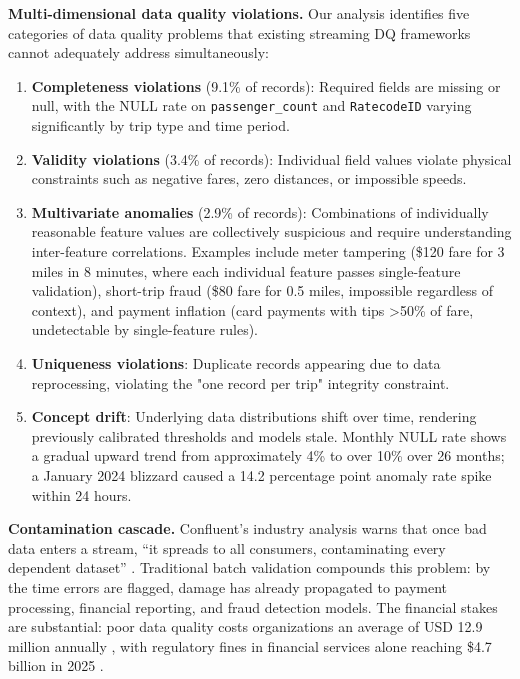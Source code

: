 \textbf{Multi-dimensional data quality violations.} Our analysis identifies five categories of data quality problems that existing streaming DQ frameworks cannot adequately address simultaneously:

\begin{enumerate}
    \item \textbf{Completeness violations} (9.1\% of records): Required fields are missing or null, with the NULL rate on \texttt{passenger\_count} and \texttt{RatecodeID} varying significantly by trip type and time period.
    \item \textbf{Validity violations} (3.4\% of records): Individual field values violate physical constraints such as negative fares, zero distances, or impossible speeds.
    \item \textbf{Multivariate anomalies} (2.9\% of records): Combinations of individually reasonable feature values are collectively suspicious and require understanding inter-feature correlations. Examples include meter tampering (\$120 fare for 3 miles in 8 minutes, where each individual feature passes single-feature validation), short-trip fraud (\$80 fare for 0.5 miles, impossible regardless of context), and payment inflation (card payments with tips >50\% of fare, undetectable by single-feature rules).
    \item \textbf{Uniqueness violations}: Duplicate records appearing due to data reprocessing, violating the "one record per trip" integrity constraint.
    \item \textbf{Concept drift}: Underlying data distributions shift over time, rendering previously calibrated thresholds and models stale. Monthly NULL rate shows a gradual upward trend from approximately 4\% to over 10\% over 26 months; a January 2024 blizzard caused a 14.2 percentage point anomaly rate spike within 24 hours.
\end{enumerate}

\textbf{Contamination cascade.} Confluent's industry analysis warns that once bad data enters a stream, ``it spreads to all consumers, contaminating every dependent dataset'' \citep{confluent_2025}. Traditional batch validation compounds this problem: by the time errors are flagged, damage has already propagated to payment processing, financial reporting, and fraud detection models. The financial stakes are substantial: poor data quality costs organizations an average of USD 12.9 million annually \citep{ibm_data_quality_cost}, with regulatory fines in financial services alone reaching \$4.7 billion in 2025 \citep{ververica2024}.

